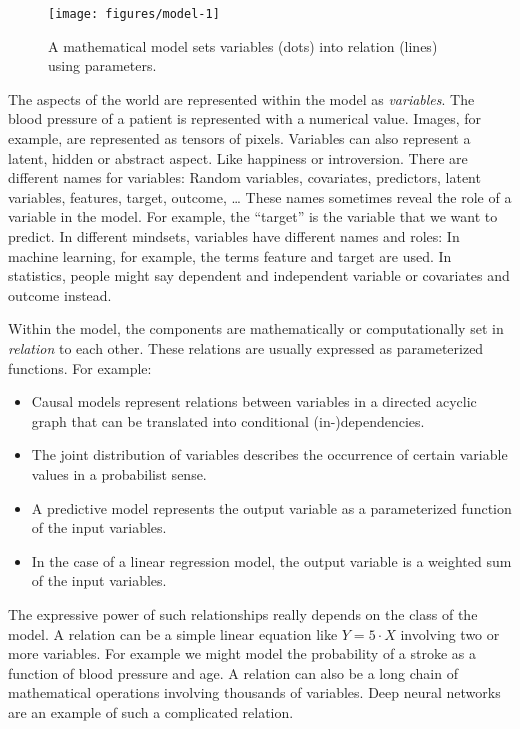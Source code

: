 \documentclass[
  10pt,
]{scrbook}
\providecommand{\tightlist}{%
  \setlength{\itemsep}{0pt}\setlength{\parskip}{0pt}}
\begin{document}
\begin{figure}

{\centering \texttt{[image: figures/model-1]} 

}

\caption{A mathematical model sets variables (dots) into relation (lines) using parameters.}\label{fig:model}
\end{figure}

The aspects of the world are represented within the model as \emph{variables}.
The blood pressure of a patient is represented with a numerical value.
Images, for example, are represented as tensors of pixels.
Variables can also represent a latent, hidden or abstract aspect.
Like happiness or introversion.
There are different names for variables:
Random variables, covariates, predictors, latent variables, features, target, outcome, \ldots{}
These names sometimes reveal the role of a variable in the model.
For example, the ``target'' is the variable that we want to predict.
In different mindsets, variables have different names and roles:
In machine learning, for example, the terms feature and target are used.
In statistics, people might say dependent and independent variable or covariates and outcome instead.

Within the model, the components are mathematically or computationally set in \emph{relation} to each other.
These relations are usually expressed as parameterized functions.
For example:

\begin{itemize}
\tightlist
\item
  Causal models represent relations between variables in a directed acyclic graph that can be translated into conditional (in-)dependencies.
\item
  The joint distribution of variables describes the occurrence of certain variable values in a probabilist sense.
\item
  A predictive model represents the output variable as a parameterized function of the input variables.
\item
  In the case of a linear regression model, the output variable is a weighted sum of the input variables.
\end{itemize}

The expressive power of such relationships really depends on the class of the model.
A relation can be a simple linear equation like \(Y = 5 \cdot X\) involving two or more variables.
For example we might model the probability of a stroke as a function of blood pressure and age.
A relation can also be a long chain of mathematical operations involving thousands of variables.
Deep neural networks are an example of such a complicated relation.
\end{document}
